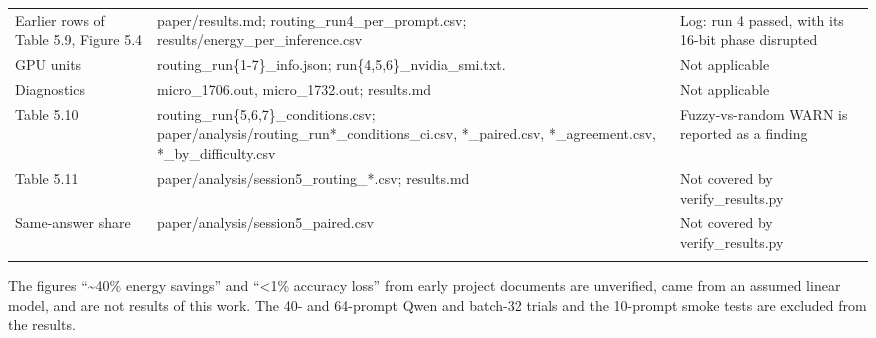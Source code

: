 \begin{longtable}{>{\raggedright\arraybackslash}p{35.1mm}>{\raggedright\arraybackslash}p{57.8mm}>{\raggedright\arraybackslash}p{48.7mm}}
Earlier rows of Table 5.9, Figure 5.4 & paper/results.md; routing\_\allowbreak{}run4\_\allowbreak{}per\_\allowbreak{}prompt.csv; results/energy\_\allowbreak{}per\_\allowbreak{}inference.csv & Log: run 4 passed, with its 16-bit phase disrupted \\
GPU units & routing\_\allowbreak{}run\{1-7\}\_\allowbreak{}info.json; run\{4,5,6\}\_\allowbreak{}nvidia\_\allowbreak{}smi.txt. & Not applicable \\
Diagnostics & micro\_\allowbreak{}1706.out, micro\_\allowbreak{}1732.out; results.md & Not applicable \\
Table 5.10 & routing\_\allowbreak{}run\{5,6,7\}\_\allowbreak{}conditions.csv; paper/analysis/routing\_\allowbreak{}run*\_\allowbreak{}conditions\_\allowbreak{}ci.csv, *\_\allowbreak{}paired.csv, *\_\allowbreak{}agreement.csv, *\_\allowbreak{}by\_\allowbreak{}difficulty.csv & Fuzzy-vs-random WARN is reported as a finding \\*
Table 5.11 & paper/analysis/session5\_\allowbreak{}routing\_\allowbreak{}*.csv; results.md & Not covered by verify\_\allowbreak{}results.py \\*
Same-answer share & paper/analysis/session5\_\allowbreak{}paired.csv & Not covered by verify\_\allowbreak{}results.py \\*
\bottomrule\noalign{\nobreak}
\end{longtable}
\endgroup

The figures ``\textasciitilde{}40\% energy savings'' and ``\textless{}1\% accuracy loss'' from early project documents are unverified, came from an assumed linear model, and are not results of this work. The 40- and 64-prompt Qwen and batch-32 trials and the 10-prompt smoke tests are excluded from the results.

